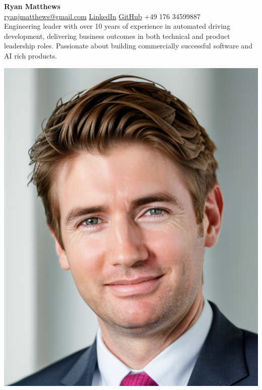 \documentclass[10pt,a4paper]{article}
\begin{document}
\begin{minipage}[c]{0.68\textwidth}
    \textbf{\LARGE Ryan Matthews}\\
    \vspace{0.1cm}
    \href{mailto:ryanjmatthews@gmail.com}{ryanjmatthews@gmail.com} \quad
    \href{https://linkedin.com/in/ryan-j-matthews}{LinkedIn} \quad
    \href{https://github.com/Darainer}{GitHub} \quad
    +49 176 34599887\\

    \vspace{10pt}
    \small
    Engineering leader with over 10 years of experience in automated driving development, delivering business outcomes in both technical and product leadership roles. Passionate about building commercially successful software and AI rich products.
\end{minipage}
\hfill
\begin{minipage}[c]{0.28\textwidth}
    \includegraphics[width=\linewidth]{profile_pic_ryan.png}
\end{minipage}
\end{document}
